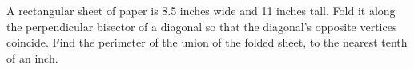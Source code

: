 A rectangular sheet of paper is 8.5 inches wide and 11 inches tall. Fold it along the perpendicular bisector of a diagonal so that the diagonal's opposite vertices coincide. Find the perimeter of the union of the folded sheet, to the nearest tenth of an inch.
